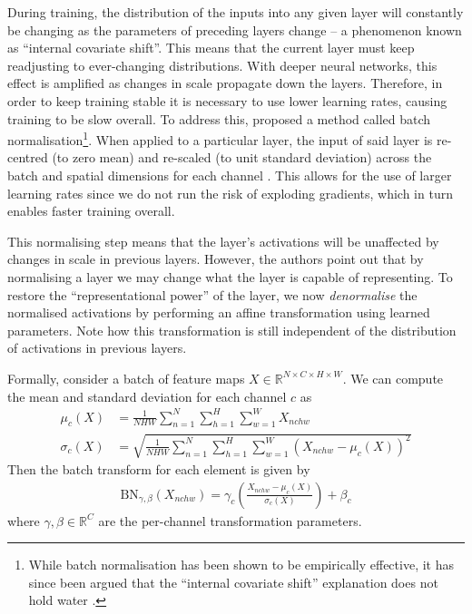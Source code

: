 During training, the distribution of the inputs into any given layer will constantly be changing as the parameters of preceding layers change -- a phenomenon known as ``internal covariate shift''.
This means that the current layer must keep readjusting to ever-changing distributions.
With deeper neural networks, this effect is amplified as changes in scale propagate down the layers.
Therefore, in order to keep training stable it is necessary to use lower learning rates, causing training to be slow overall.
To address this, \citeauthor{batchnorm} proposed a method called batch normalisation\footnote{While batch normalisation has been shown to be empirically effective, it has since been argued that the ``internal covariate shift'' explanation does not hold water \cite{lipton2018troubling, santurkar2019does}.}.
When applied to a particular layer, the input of said layer is re-centred (to zero mean) and re-scaled (to unit standard deviation) across the batch and spatial dimensions for each channel \cite{batchnorm}.
This allows for the use of larger learning rates since we do not run the risk of exploding gradients, which in turn enables faster training overall.

This normalising step means that the layer's activations will be unaffected by changes in scale in previous layers.
However, the authors point out that by normalising a layer we may change what the layer is capable of representing. 
To restore the ``representational power'' of the layer, we now \emph{denormalise} the normalised activations by performing an affine transformation using learned parameters. Note how this transformation is still independent of the distribution of activations in previous layers.

Formally, consider a batch of feature maps $X \in \mathbb{R}^{N\times C\times H\times W}$.
We can compute the mean and standard deviation for each channel $c$ as
\begin{align}
    \mu_c(X) &= \frac{1}{NHW} \sum_{n=1}^N \sum_{h=1}^H \sum_{w=1}^W X_{nchw} \label{eq:bnmean} \\ 
    \sigma_c(X) &= \sqrt{\frac{1}{NHW} \sum_{n=1}^N \sum_{h=1}^H \sum_{w=1}^W \left(X_{nchw}-\mu_c(X)\right)^2} \label{eq:bnstd}
\end{align}
Then the batch transform for each element is given by
\begin{align}
    \text{BN}_{\gamma, \beta}(X_{nchw}) = \gamma_c \left( \frac{X_{nchw}- \mu_c(X)}{\sigma_c(X)}\right) + \beta_c
\end{align}
where $\gamma, \beta \in \mathbb{R}^C$ are the per-channel transformation parameters.

